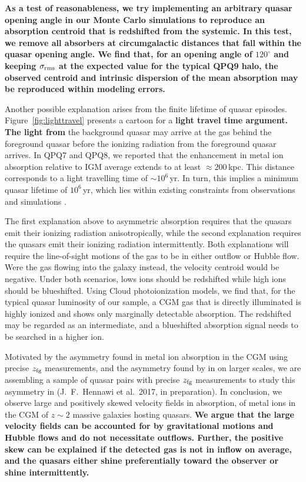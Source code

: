\documentclass[iop]{emulateapj}
\begin{document}
{\bf As a test of reasonableness, we try implementing an arbitrary quasar opening angle in our
Monte Carlo simulations to reproduce an absorption centroid that is redshifted from the systemic.
In this test, we remove all absorbers at circumgalactic distances that fall within the quasar
opening angle. We find that, for an opening angle of $120^\circ$ and keeping $\sigma_{\rm rms}$ at
the expected value for the typical QPQ9 halo, the observed centroid and intrinsic dispersion of the
 mean absorption may be reproduced within modeling errors.}

Another possible explanation arises from the finite lifetime of quasar episodes.
Figure~\ref{fig:lighttravel} presents a cartoon for a {\bf light travel time argument. The light from}
the background quasar may arrive at the gas behind
the foreground quasar before the ionizing radiation from the foreground quasar arrives. In
QPQ7 and QPQ8, we reported that the enhancement in metal ion absorption relative to IGM average
extends to at least $\approx200$\,kpc. This distance corresponds to a light travelling time of
$\sim10^6$\,yr.
In turn, this implies a minimum quasar lifetime of $10^6$\,yr, which lies within existing
constraints from
observations \citep[e.g.][]{Martini04} and simulations \citep[e.g.][]{Hopkins+05}.

The first explanation above to asymmetric
absorption requires that the quasars emit their ionizing radiation anisotropically, while the
second explanation requires the quasars emit their ionizing radiation intermittently. Both
explanations will require the line-of-sight motions of the gas to be in either outflow or Hubble
flow. Were the gas flowing into the galaxy instead, the velocity centroid would be negative.
Under both scenarios, lows ions should be redshifted while high ions should be blueshifted.
Using Cloud photoionization models, we find that, for the typical quasar luminosity of our sample,
a CGM gas that is directly illuminated is highly ionized and shows only marginally detectable
 absorption. The redshifted  may be regarded as an intermediate, and a
blueshifted absorption signal needs to be searched in a higher ion.

Motivated by the asymmetry found in metal ion absorption in the CGM using precise $z_{\rm fg}$
measurements, and the asymmetry found by \cite{KirkmanTytler08} in  on larger
scales, we are assembling a sample of quasar pairs with precise $z_{\rm fg}$ measurements to study
this asymmetry in  (J.\ F.\ Hennawi et al.\ 2017, in preparation). In conclusion, we
observe large and positively skewed velocity fields in absorption, of metal ions
in the CGM of $z\sim2$ massive galaxies hosting quasars.
{\bf We argue that the large velocity fields can be accounted for by gravitational motions and
Hubble flows and do not necessitate outflows. Further, the positive skew can be explained if the
detected gas is not in inflow on average, and the quasars either shine preferentially toward the
observer or shine intermittently.}
\end{document}
